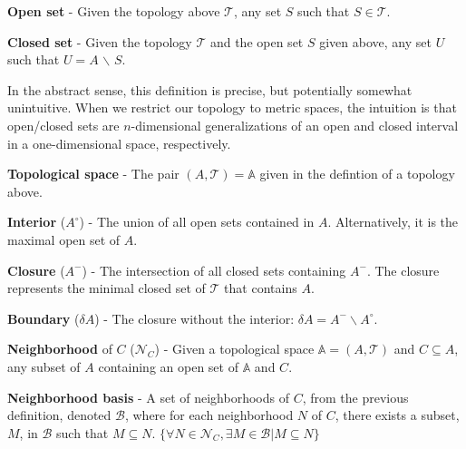 \begin{defn}
  \textbf{Open set} - Given the topology above $\mathcal{T}$, any set $S$ such
  that $S \in \mathcal{T}$.
\end{defn}

\begin{defn}
  \textbf{Closed set} - Given the topology $\mathcal{T}$ and the open set $S$
  given above, any set $U$ such that $U = A$ $\backslash$ $S$.
\end{defn}

In the abstract sense, this definition is precise, but potentially somewhat unintuitive.
%
When we restrict our topology to metric spaces, the intuition is that open/closed sets are $n$-dimensional generalizations of an open and closed interval in a one-dimensional space, respectively.

\begin{defn}
  \textbf{Topological space} - The pair $(A,\mathcal{T}) = \mathbb{A}$ given in
  the defintion of a topology above.
\end{defn}

\begin{defn}
  \textbf{Interior} ($A^{\circ}$) - The union of all open sets
  contained in $A$. Alternatively, it is the maximal open set of $A$.
\end{defn}
\begin{defn}
  \textbf{Closure} ($A^{-}$) - The intersection of all closed sets containing
  $A^{-}$. The closure represents the minimal closed set of $\mathcal{T}$ that
  contains $A$.
\end{defn}
\begin{defn}
  \textbf{Boundary} ($\delta A$) - The closure without the interior:
  $\delta A = A^{-} \backslash A^{\circ}$.
\end{defn}

\begin{defn}
  \textbf{Neighborhood} of $C$ ($\mathcal{N}_C$) - Given a topological space
  $\mathbb{A}=(A,\mathcal{T})$ and $C \subseteq A$, any subset of $A$ containing
  an open set of $\mathbb{A}$ and $C$.
\end{defn}

\begin{defn}
  \textbf{Neighborhood basis} - A set of neighborhoods of $C$,
  from the previous definition, denoted $\mathcal{B}$, where for each
  neighborhood $N$ of $C$, there exists a subset, $M$, in $\mathcal{B}$ such
  that $M \subseteq N$.
  $\{\forall N \in \mathcal{N}_C, \exists M \in \mathcal{B} | M \subseteq N\}$
\end{defn}

